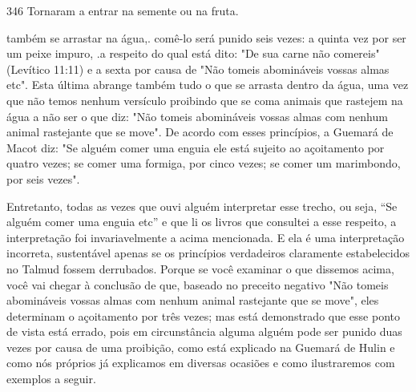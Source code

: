 346 Tornaram a entrar na semente ou na fruta.


também se arrastar na água,. comê-lo será punido seis vezes: a quinta
vez por ser um peixe impuro, .a respeito do qual está dito: "De sua
carne não come­reis" (Levítico 11:11) e a sexta por causa de "Não tomeis
abomináveis vossas almas etc". Esta última abrange também tudo o que se
arrasta dentro da água, uma vez que não temos nenhum versículo proibindo
que se coma animais que rastejem na água a não ser o que diz: "Não
tomeis abomináveis vossas almas com nenhum animal rastejante que se
move". De acordo com esses princípios, a Guemará de Macot diz: "Se
alguém comer uma enguia ele está sujeito ao açoi­tamento por quatro
vezes; se comer uma formiga, por cinco vezes; se comer um marimbondo,
por seis vezes".

Entretanto, todas as vezes que ouvi alguém interpretar esse trecho, ou
seja, ``Se alguém comer uma enguia etc'' e que li os livros que consultei
a esse respeito, a interpretação foi invariavelmente a acima mencionada.
E ela é uma interpretação incorreta, sustentável apenas se os princípios
verdadeiros cla­ramente estabelecidos no Talmud fossem derrubados.
Porque se você exami­nar o que dissemos acima, você vai chegar à
conclusão de que, baseado no pre­ceito negativo "Não tomeis abomináveis
vossas almas com nenhum animal ras­tejante que se move", eles determinam
o açoitamento por três vezes; mas está demonstrado que esse ponto de
vista está errado, pois em circunstância algu­ma alguém pode ser punido
duas vezes por causa de uma proibição, como está explicado na Guemará de
Hulin e como nós próprios já explicamos em diver­sas ocasiões e como
ilustraremos com exemplos a seguir.

